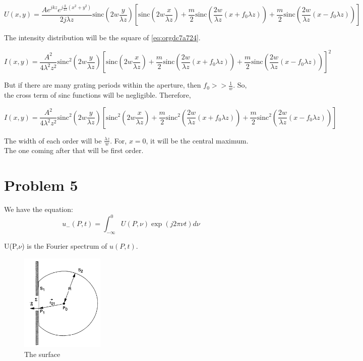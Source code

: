 \documentclass[a4paper,11pt]{article}
\begin{document}
\begin{equation}
\label{eq:orgdc7a724}
U(x,y) = \frac{Ae^{jkz}e^{j\frac{k}{2z}(x^2+y^2)}}{2j\lambda z}\text{sinc}(2w\frac{y}{\lambda z})\left[\text{sinc}(2w\frac{x}{\lambda z}) +\frac{m}{2}\text{sinc}(\frac{2w}{\lambda z}(x+f_0\lambda z)) + \frac{m}{2}\text{sinc}(\frac{2w}{\lambda z}(x-f_0\lambda z))\right]
\end{equation}

The intensity distribution will be the square of \ref{eq:orgdc7a724}.

\begin{equation}
\label{eq:orgd9f1865}
I(x,y) = \frac{A^2}{4\lambda^2 z^2}\text{sinc}^2(2w\frac{y}{\lambda z})\left[\text{sinc}(2w\frac{x}{\lambda z}) +\frac{m}{2}\text{sinc}(\frac{2w}{\lambda z}(x+f_0\lambda z)) + \frac{m}{2}\text{sinc}(\frac{2w}{\lambda z}(x-f_0\lambda z))\right]^2
\end{equation}

But if there are many grating periods within the aperture, then \(f_0>>\frac{1}{w}\). So, the cross term of sinc functions will be negligible. Therefore,

\begin{equation}
\label{eq:org2542a7b}
I(x,y) = \frac{A^2}{4\lambda^2 z^2}\text{sinc}^2(2w\frac{y}{\lambda z})\left[\text{sinc}^2(2w\frac{x}{\lambda z}) +\frac{m}{2}\text{sinc}^2(\frac{2w}{\lambda z}(x+f_0\lambda z)) + \frac{m}{2}\text{sinc}^2(\frac{2w}{\lambda z}(x-f_0\lambda z))\right]
\end{equation}

The width of each order will be \(\frac{\lambda z}{w}\). For, \(x=0\), it will be the central maximum. The one coming after that will be first order. 

\newpage
\section*{Problem 5}
\label{sec:orgee7c970}
We have the equation:
\begin{equation}
\label{eq:orge178954}
u_-(P,t) = \int_{-\infty}^{0} U(P,\nu)\exp(j 2\pi \nu t)d \nu
\end{equation}

U(P,\(\nu\)) is the Fourier spectrum of \(u(P,t)\).

\begin{figure}[htbp]
\centering
\includegraphics[width=4cm]{Pr_5_figure.png}
\caption{\label{fig:org6938c93}The surface}
\end{figure}
\end{document}
